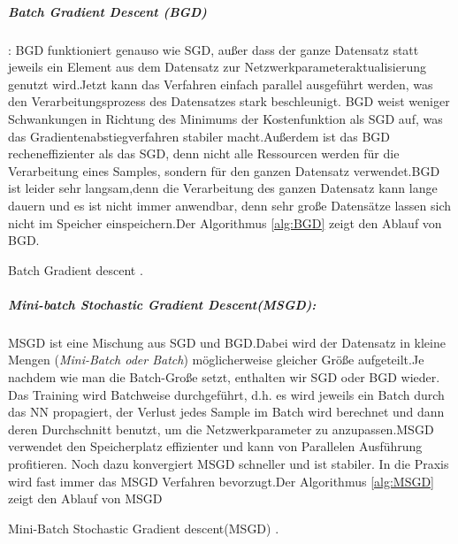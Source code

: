 \documentclass[12pt,a4paper]{scrartcl}
\numberwithin{equation}{section}
\begin{document}
\subparagraph{Batch Gradient Descent (BGD)}:
BGD funktioniert genauso wie SGD, außer dass der ganze Datensatz statt jeweils ein Element aus dem Datensatz zur Netzwerkparameteraktualisierung genutzt wird.Jetzt kann das Verfahren einfach parallel ausgeführt werden, was den Verarbeitungsprozess des Datensatzes stark beschleunigt. BGD weist weniger Schwankungen in Richtung des Minimums der Kostenfunktion als SGD auf, was das Gradientenabstiegverfahren stabiler macht.Außerdem ist das BGD recheneffizienter als das SGD, denn nicht alle Ressourcen werden für die Verarbeitung eines Samples, sondern für den ganzen Datensatz verwendet.BGD ist leider sehr langsam,denn die Verarbeitung des ganzen Datensatz kann lange dauern und es ist nicht immer anwendbar, denn sehr große Datensätze lassen sich nicht im Speicher einspeichern.Der Algorithmus \ref{alg:BGD} zeigt den Ablauf von BGD.
\begin{algorithm}
	

	\DontPrintSemicolon
	
	\caption{Batch Gradient descent \cite{CNNStory}.}
	\label{alg:BGD}
\end{algorithm}
\subparagraph{Mini-batch Stochastic Gradient Descent(MSGD): }
MSGD ist eine Mischung aus SGD und BGD.Dabei wird der Datensatz in kleine Mengen (\textit{Mini-Batch oder Batch}) möglicherweise gleicher Größe aufgeteilt.Je nachdem wie man die Batch-Große setzt, enthalten wir SGD oder BGD wieder. Das Training wird Batchweise durchgeführt, d.h. es wird jeweils ein Batch durch das \ac{NN} propagiert, der Verlust jedes Sample im Batch wird berechnet und dann deren Durchschnitt benutzt, um die Netzwerkparameter zu anzupassen.MSGD verwendet den Speicherplatz effizienter und kann von Parallelen Ausführung profitieren. Noch  dazu konvergiert MSGD schneller und ist stabiler. In die Praxis wird fast immer das MSGD Verfahren bevorzugt.Der Algorithmus \ref{alg:MSGD} zeigt den Ablauf von MSGD

\begin{algorithm}
	\DontPrintSemicolon
	
	\caption{Mini-Batch Stochastic Gradient descent(MSGD) \cite{CNNStory}.}
	\label{alg:MSGD}
\end{algorithm}
\end{document}
